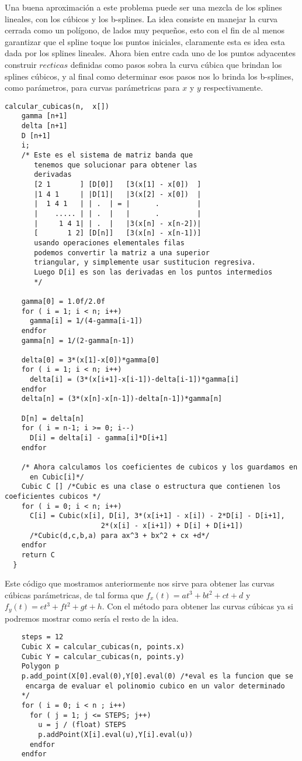 Una buena aproximaci\'on a este problema puede ser una
mezcla de los splines lineales, con los c\'ubicos y los b-splines.
La idea consiste en manejar la curva cerrada como un pol\'igono, de lados
muy peque\~nos, esto con el fin de al menos garantizar que el spline
toque los puntos iniciales, claramente esta es idea esta dada por los
splines lineales. Ahora bien entre cada uno de los puntos
adyacentes construir $recticas$ definidas como pasos sobra la
curva c\'ubica que brindan los splines c\'ubicos, y al final como determinar
esos pasos nos lo brinda los b-splines, como par\'ametros,
para curvas par\'ametricas para $x$ y $y$ respectivamente.
\begin{verbatim}
calcular_cubicas(n,  x[])
    gamma [n+1]
    delta [n+1]
    D [n+1]
    i;
    /* Este es el sistema de matriz banda que
       tenemos que solucionar para obtener las
       derivadas
       [2 1       ] [D[0]]   [3(x[1] - x[0])  ]
       |1 4 1     | |D[1]|   |3(x[2] - x[0])  |
       |  1 4 1   | | .  | = |      .         |
       |    ..... | | .  |   |      .         |
       |     1 4 1| | .  |   |3(x[n] - x[n-2])|
       [       1 2] [D[n]]   [3(x[n] - x[n-1])]
       usando operaciones elementales filas
       podemos convertir la matriz a una superior
       triangular, y simplemente usar sustitucion regresiva.
       Luego D[i] es son las derivadas en los puntos intermedios
       */

    gamma[0] = 1.0f/2.0f
    for ( i = 1; i < n; i++)
      gamma[i] = 1/(4-gamma[i-1])
    endfor
    gamma[n] = 1/(2-gamma[n-1])

    delta[0] = 3*(x[1]-x[0])*gamma[0]
    for ( i = 1; i < n; i++)
      delta[i] = (3*(x[i+1]-x[i-1])-delta[i-1])*gamma[i]
    endfor
    delta[n] = (3*(x[n]-x[n-1])-delta[n-1])*gamma[n]

    D[n] = delta[n]
    for ( i = n-1; i >= 0; i--)
      D[i] = delta[i] - gamma[i]*D[i+1]
    endfor

    /* Ahora calculamos los coeficientes de cubicos y los guardamos en
      en Cubic[i]*/
    Cubic C [] /*Cubic es una clase o estructura que contienen los coeficientes cubicos */
    for ( i = 0; i < n; i++)
      C[i] = Cubic(x[i], D[i], 3*(x[i+1] - x[i]) - 2*D[i] - D[i+1],
                       2*(x[i] - x[i+1]) + D[i] + D[i+1])
      /*Cubic(d,c,b,a) para ax^3 + bx^2 + cx +d*/
    endfor
    return C
  }
\end{verbatim}
Este c\'odigo que mostramos anteriormente nos sirve para obtener las curvas c\'ubicas
par\'ametricas, de tal forma que $f_x(t) = at^3+bt^2+ct+d$ y $f_y(t) = et^3+ft^2+gt+h$.
Con el m\'etodo para obtener las curvas c\'ubicas ya si podremos mostrar
como ser\'ia el resto de la idea.
\begin{verbatim}
    steps = 12
    Cubic X = calcular_cubicas(n, points.x)
    Cubic Y = calcular_cubicas(n, points.y)
    Polygon p
    p.add_point(X[0].eval(0),Y[0].eval(0) /*eval es la funcion que se
     encarga de evaluar el polinomio cubico en un valor determinado
    */
    for ( i = 0; i < n ; i++)
      for ( j = 1; j <= STEPS; j++)
        u = j / (float) STEPS
        p.addPoint(X[i].eval(u),Y[i].eval(u))
      endfor
    endfor
\end{verbatim}


